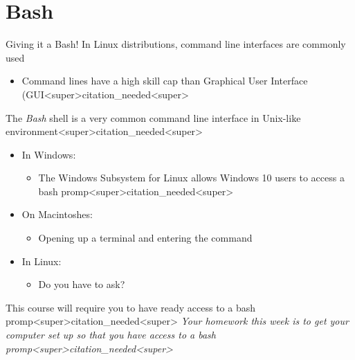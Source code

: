 \documentclass[11pt]{beamer}
\let\OldTexttt\texttt
\renewcommand{\texttt}[1]{\OldTexttt{\color{teal}{#1}}}
\begin{document}
\section[Using a Command Line]{Bash}
\begin{frame}{Giving it a Bash!}
In Linux distributions, command line interfaces are commonly used
\begin{itemize}
\item Command lines have a high skill cap than Graphical User Interface (GUI<super>citation_needed<super>  
\end{itemize}
The \textit{Bash} shell is a very common command line interface in Unix-like environment<super>citation_needed<super>
\begin{itemize}
\item In Windows:
	\begin{itemize}
	\item The Windows Subsystem for Linux allows Windows 10 users to access a bash promp<super>citation_needed<super> 
	\end{itemize}
\item On Macintoshes:
	\begin{itemize}
	\item Opening up a terminal and entering the command \texttt{bash}
	\end{itemize}
\item In Linux:
	\begin{itemize}
	\item Do you have to ask? 
	\end{itemize}
\end{itemize}
This course will require you to have ready access to a bash promp<super>citation_needed<super>  \textit{Your homework this week is to get your computer set up so that you have access to a bash promp<super>citation_needed<super>}  
\end{frame}
\end{document}

